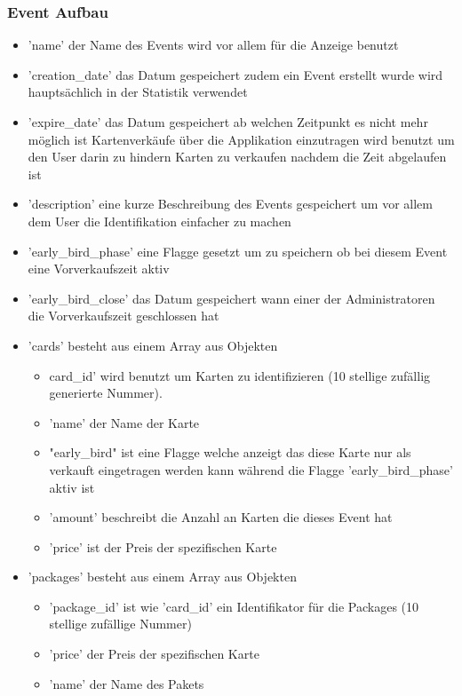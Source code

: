 			\subsubsection{Event Aufbau}			
				\begin{itemize}
					\item 'name' der Name des Events wird vor allem für die Anzeige benutzt
					\item 'creation\_date' das Datum gespeichert zudem ein Event erstellt wurde wird hauptsächlich in der Statistik verwendet
					\item 'expire\_date' das Datum gespeichert ab welchen Zeitpunkt es nicht mehr möglich ist Kartenverkäufe über die Applikation einzutragen wird benutzt um den User darin zu hindern Karten zu verkaufen nachdem die Zeit abgelaufen ist
					\item 'description' eine kurze Beschreibung des Events gespeichert um vor allem dem User die Identifikation einfacher zu machen
					\item 'early\_bird\_phase' eine Flagge gesetzt um zu speichern ob bei diesem Event eine Vorverkaufszeit aktiv
					\item 'early\_bird\_close' das Datum gespeichert wann einer der Administratoren die Vorverkaufszeit geschlossen hat
					\item 'cards' besteht aus einem Array aus Objekten
					\begin{itemize}
						\item card\_id' wird benutzt um Karten zu identifizieren (10 stellige zufällig generierte Nummer). 
						\item 'name' der Name der Karte
						\item "early\_bird" ist eine Flagge welche anzeigt das diese Karte nur als verkauft eingetragen werden kann während die Flagge 'early\_bird\_phase' aktiv ist
						\item 'amount' beschreibt die Anzahl an Karten die dieses Event hat
						\item 'price' ist der Preis der spezifischen Karte
					\end{itemize}
					\item 'packages' besteht aus einem Array aus Objekten
					\begin{itemize}
						\item 'package\_id' ist wie 'card\_id' ein Identifikator für die Packages (10 stellige zufällige Nummer)
						\item 'price' der Preis der spezifischen Karte
						\item 'name' der Name des Pakets

\end{itemize}
\end{itemize}
